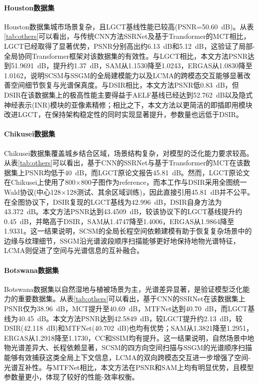 \documentclass[UTF8,a4paper,11pt]{ctexart}
\begin{document}
\paragraph{Houston数据集}
Houston数据集城市场景复杂，且LGCT基线性能已较高(PSNR=50.60~dB)。从表\ref{tab:others}可以看出，与传统CNN方法SSRNet及基于Transformer的MCT相比，LGCT已经取得了显著优势，PSNR分别高出约6.13~dB和5.12~dB，这验证了局部-全局协同Transformer框架对该数据集的有效性。与LGCT相比，本文方法PSNR达到51.9691~dB，提升约1.37~dB，SAM从1.1530降至1.0243，ERGAS从1.0830降至1.0162，说明SCSM与SSGM的全局建模能力以及LCMA的跨模态交互能够显著改善空间细节恢复与光谱保真度。与DSIR相比，本文方法PSNR低0.83~dB，但DSIR在该数据集上的极高性能主要得益于AELF基线已经达到52.762~dB以及隐式神经表示(INR)模块的亚像素精修；相比之下，本文方法以更简洁的即插即用模块改进LGCT，在保持架构稳定性的同时实现显著提升，参数量也远低于DSIR。

\paragraph{Chikusei数据集}
Chikusei数据集覆盖城乡结合区域，场景结构复杂，对模型的泛化能力要求较高。从表\ref{tab:others}可以看出，基于CNN的SSRNet与基于Transformer的MCT在该数据集上PSNR均低于40~dB，而LGCT原论文报告45.81~dB。然而，LGCT原论文在Chikusei上使用了800$\times$800子图作为reference，而本工作与DSIR采用全图统一Wald协议(中心128$\times$128测试、其余区域训练)，因此直接引用45.81~dB并不公平。在全图协议下，DSIR复现的LGCT基线为42.996~dB，DSIR自身方法为43.372~dB。本文方法PSNR达到43.4509~dB，较该协议下的LGCT基线提升约0.45~dB，并略高于DSIR，SAM从1.4747降至1.4006，ERGAS从1.9864降至1.9331。这一结果说明，SCSM的全局长程空间依赖建模有助于恢复复杂场景中的边缘与纹理细节，SSGM沿光谱波段顺序扫描能够更好地保持地物光谱特征，LCMA则促进了空间与光谱信息的互补融合。

\paragraph{Botswana数据集}
Botswana数据集以自然湿地与植被场景为主，光谱差异显著，是验证模型泛化能力的重要数据集。从表\ref{tab:others}可以看出，基于CNN的SSRNet在该数据集上PSNR仅为38.96~dB，MCT提升至40.69~dB，MTFNet达到40.70~dB，而LGCT基线为40.45~dB。本文方法PSNR达到42.5849~dB，较LGCT提升约2.13~dB，较DSIR(42.118~dB)和MTFNet(40.702~dB)也均有优势；SAM从1.3821降至1.2951，ERGAS从1.2918降至1.1730，CC和SSIM均有提升。这一结果说明，自然场景中地物光谱差异大、长程依赖显著，SCSM的四方向空间扫描与SSGM的光谱顺序扫描能够有效捕获这类全局上下文信息，LCMA的双向跨模态交互进一步增强了空间-光谱互补性。与MTFNet相比，本文方法在PSNR和SAM上均有明显优势，且模型参数量更小，体现了较好的性能-效率权衡。
\end{document}
